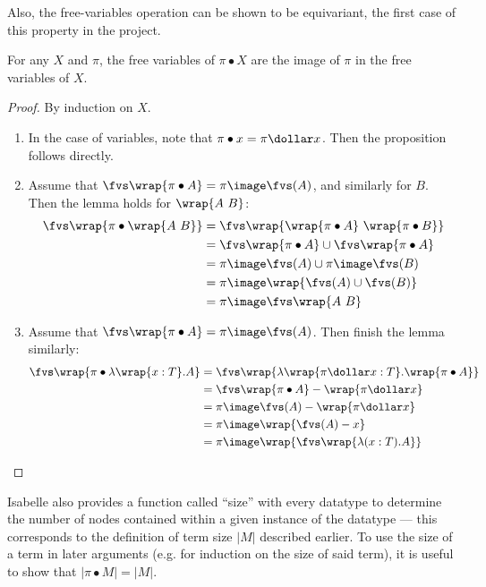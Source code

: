 Also, the free-variables operation can be shown to be equivariant, the first case of this property in the project.
\begin{lemma}
For any \(X\) and \(\pi\), the free variables of \(\pi \bullet X\) are the image of \(\pi\) in the free variables of \(X\).
\end{lemma}
\begin{proof}
By induction on \(X\).
\begin{enumerate}
\item
In the case of variables, note that \(\pi \bullet x = \pi \dollar x\).
Then the proposition follows directly.
\item
Assume that \(\fvs\wrap{\pi \bullet A} = \pi \image \fvs(A)\), and similarly for \(B\).
Then the lemma holds for \(\wrap{A\ B}\):
\begin{align*}
\fvs\wrap{\pi \bullet \wrap{A\ B}}
&= \fvs\wrap{\wrap{\pi \bullet A}\ \wrap{\pi \bullet B}}\\
&= \fvs\wrap{\pi \bullet A} \cup \fvs\wrap{\pi \bullet A}\\
&= \pi \image \fvs(A) \cup \pi \image \fvs(B)\\
&= \pi \image \wrap{\fvs(A) \cup \fvs(B)}\\
&= \pi \image \fvs\wrap{A\ B}
\end{align*}
\item
Assume that \(\fvs\wrap{\pi \bullet A} = \pi \image \fvs(A)\).
Then finish the lemma similarly:
\begin{align*}
\fvs\wrap{\pi \bullet \lambda \wrap{x:T}.A} 
&= \fvs\wrap{\lambda \wrap{\pi \dollar x : T}. \wrap{\pi \bullet A}}\\
&= \fvs\wrap{\pi \bullet A} - \wrap{\pi \dollar x}\\
&= \pi \image \fvs(A) - \wrap{\pi \dollar x}\\
&= \pi \image \wrap{\fvs(A) - x}\\
&= \pi \image \wrap{\fvs\wrap{\lambda (x:T).A}}
\end{align*}
\end{enumerate}
\end{proof}

Isabelle also provides a function called ``size'' with every datatype to determine the number of nodes contained within a given instance of the datatype --- this corresponds to the definition of term size \(|M|\) described earlier.
To use the size of a term in later arguments (e.g. for induction on the size of said term), it is useful to show that \(|\pi \bullet M| = |M|\).

